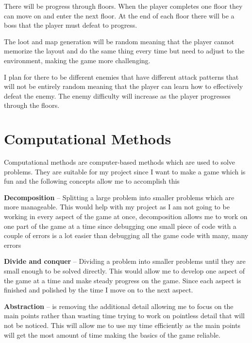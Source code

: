 \documentclass{article}
\newcommand{\parBr}{\vspace{5mm}}%
\begin{document}
\parBr

There will be progress through floors. When the player completes one floor they can move on and enter the next floor. At the end of each floor there will be a boss that the player must defeat to progress.

\parBr

The loot and map generation will be random meaning that the player cannot memorize the layout and do the same thing every time but need to adjust to the environment, making the game more challenging.

\parBr

I plan for there to be different enemies that have different attack patterns that will not be entirely random meaning that the player can learn how to effectively defeat the enemy. The enemy difficulty will increase as the player progresses through the floors.

\section{Computational Methods}
Computational methods are computer-based methods which are used to solve problems. They are suitable for my project since I want to make a game which is fun and the following concepts allow me to accomplish this 

\parBr

\textbf{Decomposition} – Splitting a large problem into smaller problems which are more manageable. This would help with my project as I am not going to be working in every aspect of the game at once, decomposition allows me to work on one part of the game at a time since debugging one small piece of code with a couple of errors is a lot easier than debugging all the game code with many, many errors

\parBr

\textbf{Divide and conquer} – Dividing a problem into smaller problems until they are small enough to be solved directly. This would allow me to develop one aspect of the game at a time and make steady progress on the game. Since each aspect is finished and polished by the time I move on to the next aspect.

\parBr

\textbf{Abstraction} – is removing the additional detail allowing me to focus on the main points rather than wasting time trying to work on pointless detail that will not be noticed. This will allow me to use my time efficiently as the main points will get the most amount of time making the basics of the game reliable.
\end{document}
